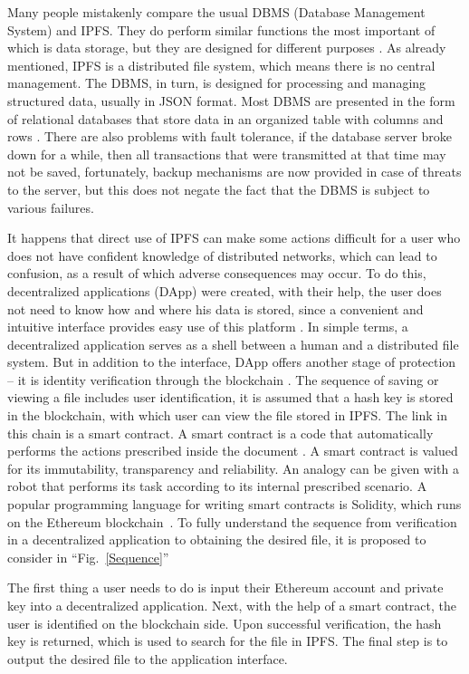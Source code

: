 \documentclass[10pt,conference,a4paper]{IEEEtran_EDM}
\begin{document}
Many people mistakenly compare the usual DBMS (Database Management System) and IPFS.
They do perform similar functions the most important of which is data storage, but they are designed for different purposes \cite{Ruan}.
As already mentioned, IPFS is a distributed file system, which means there is no central management.
The DBMS, in turn, is designed for processing and managing structured data, usually in JSON format.
Most DBMS are presented in the form of relational databases that store data in an organized table with columns and rows \cite{Gillenson}.
There are also problems with fault tolerance, if the database server broke down for a while, then all transactions that were transmitted at that time may not be saved, fortunately, backup mechanisms are now provided in case of threats to the server, but this does not negate the fact that the DBMS is subject to various failures.

It happens that direct use of IPFS can make some actions difficult for a user who does not have confident knowledge of distributed networks, which can lead to confusion, as a result of which adverse consequences may occur.
To do this, decentralized applications (DApp) were created, with their help, the user does not need to know how and where his data is stored, since a convenient and intuitive interface provides easy use of this platform \cite{Infante}.
In simple terms, a decentralized application serves as a shell between a human and a distributed file system.
But in addition to the interface, DApp offers another stage of protection – it is identity verification through the blockchain \cite{Lin}.
The sequence of saving or viewing a file includes user identification, it is assumed that a hash key is stored in the blockchain, with which user can view the file stored in IPFS.
The link in this chain is a smart contract.
A smart contract is a code that automatically performs the actions prescribed inside the document \cite{Frolov}.
A smart contract is valued for its immutability, transparency and reliability.
An analogy can be given with a robot that performs its task according to its internal prescribed scenario.
A popular programming language for writing smart contracts is Solidity, which runs on the Ethereum blockchain~\cite{Khan Nabeel}.
To fully understand the sequence from verification in a decentralized application to obtaining the desired file, it is proposed to consider in ``Fig.~\ref{Sequence}''

The first thing a user needs to do is input their Ethereum account and private key into a decentralized application.
Next, with the help of a smart contract, the user is identified on the blockchain side.
Upon successful verification, the hash key is returned, which is used to search for the file in IPFS.
The final step is to output the desired file to the application interface.
\end{document}
